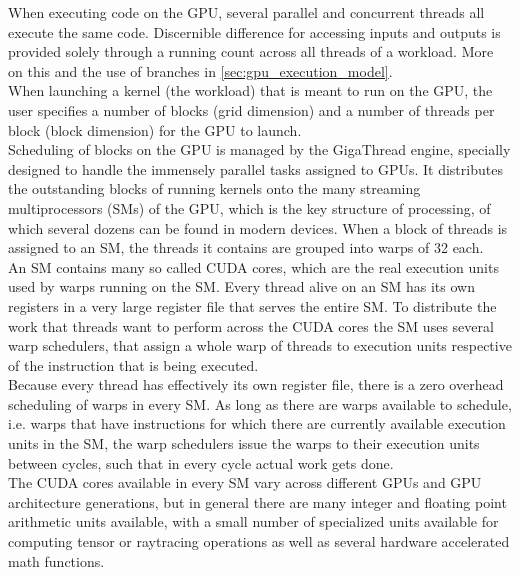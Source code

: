 \documentclass{tudscrreprt}
\begin{document}
				When executing code on the GPU, several parallel and concurrent threads all execute the same code. Discernible difference for accessing inputs and outputs is provided solely through a running count across all threads of a workload. More on this and the use of branches in \ref{sec:gpu_execution_model}. \\
				When launching a kernel (the workload) that is meant to run on the GPU, the user specifies a number of blocks (grid dimension) and a number of threads per block (block dimension) for the GPU to launch. \\
				Scheduling of blocks on the GPU is managed by the GigaThread engine, specially designed to handle the immensely parallel tasks assigned to GPUs. It distributes the outstanding blocks of running kernels onto the many streaming multiprocessors (SMs) of the GPU, which is the key structure of processing, of which several dozens can be found in modern devices. When a block of threads is assigned to an SM, the threads it contains are grouped into warps of 32 each. \\
				
				An SM contains many so called CUDA cores, which are the real execution units used by warps running on the SM. Every thread alive on an SM has its own registers in a very large register file that serves the entire SM. To distribute the work that threads want to perform across the CUDA cores the SM uses several warp schedulers, that assign a whole warp of threads to execution units respective of the instruction that is being executed. \\
				Because every thread has effectively its own register file, there is a zero overhead scheduling of warps in every SM. As long as there are warps available to schedule, i.e. warps that have instructions for which there are currently available execution units in the SM, the warp schedulers issue the warps to their execution units between cycles, such that in every cycle actual work gets done. \\
				
				The CUDA cores available in every SM vary across different GPUs and GPU architecture generations, but in general there are many integer and floating point arithmetic units available, with a small number of specialized units available for computing tensor or raytracing operations as well as several hardware accelerated math functions. \\
				
\end{document}
